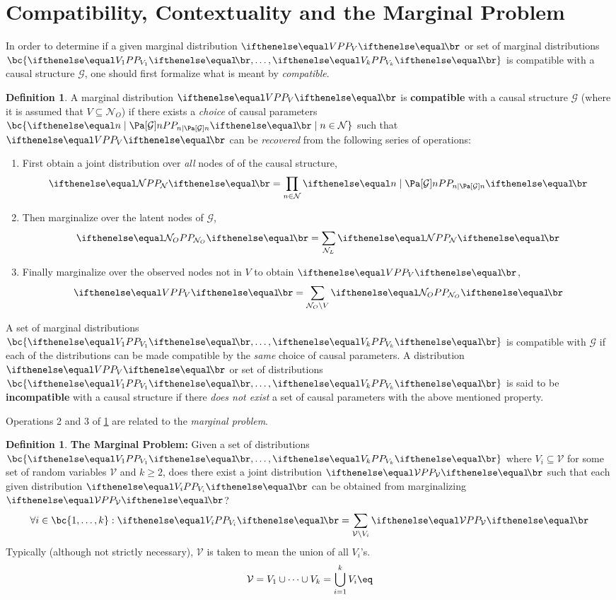 \documentclass[aps, 10pt, english, twoside, pra, nofootinbib, longbibliography]{revtex4-1}
\theoremstyle{plain}
\theoremstyle{definition}
\newtheorem{definition}[theorem]{Definition}
\theoremstyle{remark}
\newcommand{\graph}{\mathcal{G}}
\newcommand{\nodes}{\mathcal{N}}
\newcommand{\term}[1]{\textcolor{Mahogany}{\textbf{#1}}}
\begin{document}
    \section{Compatibility, Contextuality and the Marginal Problem}
    In order to determine if a given marginal distribution $\prob[V]$ or set of marginal distributions $\bc{\prob[V_1], \ldots, \prob[V_k]}$ is compatible with a causal structure $\graph$, one should first formalize what is meant by \textit{compatible}.
    \begin{definition}
        \label{def:compatible}
        A marginal distribution $\prob[V]$ is \term{compatible} with a causal structure $\graph$ (where it is assumed that $V \subseteq \nodes_O$) if there exists a \textit{choice} of causal parameters $\bc{\prob[n \mid \Pa[\graph]{n}] \mid n \in \nodes}$ such that $\prob[V]$ can be \textit{recovered} from the following series of operations:

        \begin{enumerate}
            \item First obtain a joint distribution over \textit{all} nodes of of the causal structure,
            \[ \prob[\nodes] = \prod_{n \in \nodes} \prob[n \mid \Pa[\graph]{n}] \]
            \item Then marginalize over the latent nodes of $\graph$,
            \[ \prob[\nodes_O] = \sum_{\nodes_L} \prob[\nodes] \]
            \item Finally marginalize over the observed nodes not in $V$ to obtain $\prob[V]$,
            \[ \prob[V] = \sum_{\nodes_O \setminus V} \prob[\nodes_O] \]
        \end{enumerate}
        A set of marginal distributions $\bc{\prob[V_1], \ldots, \prob[V_k]}$ is compatible with $\graph$ if each of the distributions can be made compatible by the \textit{same} choice of causal parameters.
        A distribution $\prob[V]$ or set of distributions $\bc{\prob[V_1], \ldots, \prob[V_k]}$ is said to be \term{incompatible} with a causal structure if there \textit{does not exist} a set of causal parameters with the above mentioned property.

    \end{definition}

    Operations 2 and 3 of \cref{def:compatible} are related to the \textit{marginal problem}.
    \begin{definition}
        \label{def:marginal_problem}
        \term{The Marginal Problem:} Given a set of distributions $\bc{\prob[V_1], \ldots, \prob[V_k]}$ where $V_i \subseteq \mathcal{V}$ for some set of random variables $\mathcal{V}$ and $k \geq 2$, does there exist a joint distribution $\prob[\mathcal{V}]$ such that each given distribution $\prob[V_i]$ can be obtained from marginalizing $\prob[\mathcal{V}]$?
        \[ \forall i \in \bc{1, \ldots, k} : \prob[V_i] = \sum_{\mathcal{V} \setminus V_i} \prob[\mathcal{V}] \]
        Typically (although not strictly necessary), $\mathcal{V}$ is taken to mean the union of all $V_i$'s.
        \[ \mathcal{V} = V_1 \cup \cdots \cup V_k = \bigcup_{i=1}^{k} V_i \eq \label{eq:marginals_union} \]
    \end{definition}
\end{document}
